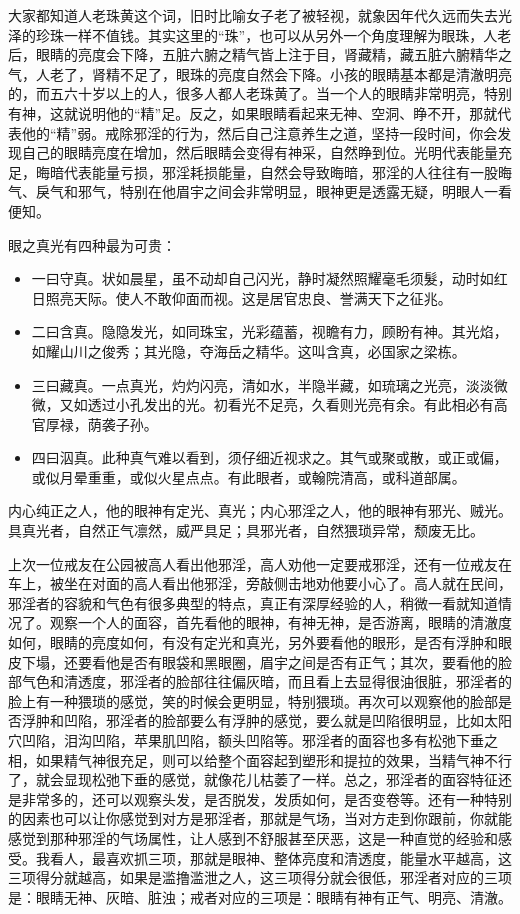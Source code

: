 大家都知道人老珠黄这个词，旧时比喻女子老了被轻视，就象因年代久远而失去光泽的珍珠一样不值钱。其实这里的“珠”，也可以从另外一个角度理解为眼珠，人老后，眼睛的亮度会下降，五脏六腑之精气皆上注于目，肾藏精，藏五脏六腑精华之气，人老了，肾精不足了，眼珠的亮度自然会下降。小孩的眼睛基本都是清澈明亮的，而五六十岁以上的人，很多人都人老珠黄了。当一个人的眼睛非常明亮，特别有神，这就说明他的“精”足。反之，如果眼睛看起来无神、空洞、睁不开，那就代表他的“精”弱。戒除邪淫的行为，然后自己注意养生之道，坚持一段时间，你会发现自己的眼睛亮度在增加，然后眼睛会变得有神采，自然睁到位。光明代表能量充足，晦暗代表能量亏损，邪淫耗损能量，自然会导致晦暗，邪淫的人往往有一股晦气、戾气和邪气，特别在他眉宇之间会非常明显，眼神更是透露无疑，明眼人一看便知。

眼之真光有四种最为可贵：

\begin{itemize}
    \item 一曰守真。状如晨星，虽不动却自己闪光，静时凝然照耀毫毛须髮，动时如红日照亮天际。使人不敢仰面而视。这是居官忠良、誉满天下之征兆。
    \item 二曰含真。隐隐发光，如同珠宝，光彩蕴蓄，视瞻有力，顾盼有神。其光焰，如耀山川之俊秀；其光隐，夺海岳之精华。这叫含真，必国家之梁栋。
    \item 三曰藏真。一点真光，灼灼闪亮，清如水，半隐半藏，如琉璃之光亮，淡淡微微，又如透过小孔发出的光。初看光不足亮，久看则光亮有余。有此相必有高官厚禄，荫袭子孙。
    \item 四曰泅真。此种真气难以看到，须仔细近视求之。其气或聚或散，或正或偏，或似月晕重重，或似火星点点。有此眼者，或翰院清高，或科道部属。
\end{itemize}

内心纯正之人，他的眼神有定光、真光；内心邪淫之人，他的眼神有邪光、贼光。具真光者，自然正气凛然，威严具足；具邪光者，自然猥琐异常，颓废无比。

上次一位戒友在公园被高人看出他邪淫，高人劝他一定要戒邪淫，还有一位戒友在车上，被坐在对面的高人看出他邪淫，旁敲侧击地劝他要小心了。高人就在民间，邪淫者的容貌和气色有很多典型的特点，真正有深厚经验的人，稍微一看就知道情况了。观察一个人的面容，首先看他的眼神，有神无神，是否游离，眼睛的清澈度如何，眼睛的亮度如何，有没有定光和真光，另外要看他的眼形，是否有浮肿和眼皮下塌，还要看他是否有眼袋和黑眼圈，眉宇之间是否有正气；其次，要看他的脸部气色和清透度，邪淫者的脸部往往偏灰暗，而且看上去显得很油很脏，邪淫者的脸上有一种猥琐的感觉，笑的时候会更明显，特别猥琐。再次可以观察他的脸部是否浮肿和凹陷，邪淫者的脸部要么有浮肿的感觉，要么就是凹陷很明显，比如太阳穴凹陷，泪沟凹陷，苹果肌凹陷，额头凹陷等。邪淫者的面容也多有松弛下垂之相，如果精气神很充足，则可以给整个面容起到塑形和提拉的效果，当精气神不行了，就会显现松弛下垂的感觉，就像花儿枯萎了一样。总之，邪淫者的面容特征还是非常多的，还可以观察头发，是否脱发，发质如何，是否变卷等。还有一种特别的因素也可以让你感觉到对方是邪淫者，那就是气场，当对方走到你跟前，你就能感觉到那种邪淫的气场属性，让人感到不舒服甚至厌恶，这是一种直觉的经验和感受。我看人，最喜欢抓三项，那就是眼神、整体亮度和清透度，能量水平越高，这三项得分就越高，如果是滥撸滥泄之人，这三项得分就会很低，邪淫者对应的三项是：眼睛无神、灰暗、脏浊；戒者对应的三项是：眼睛有神有正气、明亮、清澈。

